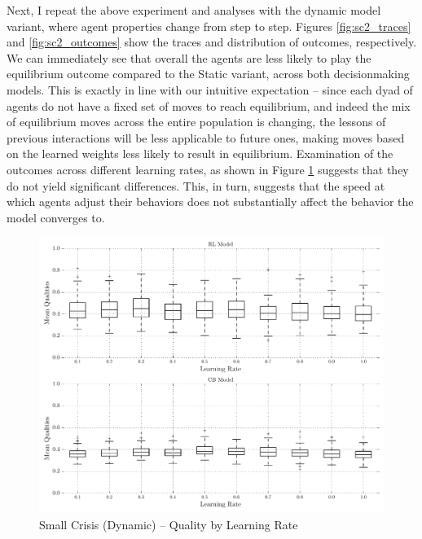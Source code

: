 Next, I repeat the above experiment and analyses with the dynamic model variant, where agent properties change from step to step. Figures \ref{fig:sc2_traces} and \ref{fig:sc2_outcomes} show the traces and distribution of outcomes, respectively. We can immediately see that overall the agents are less likely to play the equilibrium outcome compared to the Static variant, across both decisionmaking models. This is exactly in line with our intuitive expectation -- since each dyad of agents do not have a fixed set of moves to reach equilibrium, and indeed the mix of equilibrium moves across the entire population is changing, the lessons of previous interactions will be less applicable to future ones, making moves based on the learned weights less likely to result in equilibrium. Examination of the outcomes across different learning rates, as shown in Figure \ref{fig:sc2_boxwhiskers} suggests that they do not yield significant differences. This, in turn, suggests that the speed at which agents adjust their behaviors does not substantially affect the behavior the model converges to.
\begin{figure}[h!]
	\includegraphics[width=\textwidth]{WarReason/Figures/SC_2_boxwhiskers}
    \caption{Small Crisis (Dynamic) -- Quality by Learning Rate}
    \label{fig:sc2_boxwhiskers}
    \figSpace
\end{figure}

